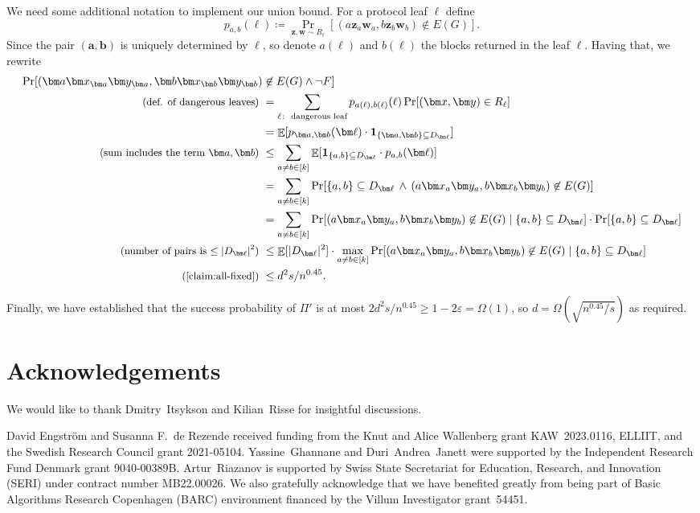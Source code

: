 \documentclass[10pt,a4paper]{article}
\theoremstyle{definition}
\theoremstyle{remark}
\theoremstyle{example}
\theoremstyle{plain}
\DeclareMathOperator{\Exp}{\mathbb{E}}
\renewcommand{\epsilon}{\varepsilon}
\newcommand{\protocolPiAlt}{\Pi'}
\begin{document}
We need some additional notation to implement our union bound. For a protocol leaf $\ell$ define 
\[p_{a,b}(\ell) \coloneqq \Pr_{\bm z, \bm w \sim R_\ell}[(a \bm z_{a} \bm w_{ a}, b \bm z_b \bm w_b) \not\in E(G)].\]
 Since the pair $(\bm a, \bm b)$ is uniquely determined by $\bm \ell$, so denote $a(\ell)$ and $b(\ell)$ the blocks returned in the leaf $\ell$. 
Having that, we rewrite
\begin{align*}
    \Pr[(\bm a \bm x_{\bm a} \bm y_{\bm a}, \bm b \bm x_{\bm b} \bm y_{\bm b})& \not\in E(G) \land \lnot F] \\
   \text{\small (def. of dangerous leaves) } &=
    \sum_{\ell\colon \text{ dangerous leaf}} p_{a(\ell),b(\ell)}(\ell) \Pr[(\bm x, \bm y) \in R_\ell]\\
    &=
    \Exp[p_{\bm a, \bm b}(\bm \ell) \cdot \mathbf{1}_{\{\bm a, \bm b\} \subseteq D_{\bm \ell}}]\\
   \text{\small (sum includes the term $\bm a, \bm b$) } &\le \sum_{a \neq b \in [k]} \Exp[\mathbf{1}_{\{a,b\} \subseteq D_{\bm \ell}} \cdot p_{a,b}(\bm \ell)]\\
    &= \sum_{a \neq b \in [k]} \Pr[\{a,b\} \subseteq D_{\bm \ell} \,\land\,(a \bm x_a \bm y_a, b \bm x_b \bm y_b) \not\in E(G)]\\
    &= \sum_{a \neq b \in [k]} \Pr[(a \bm x_a \bm y_a, b \bm x_b \bm y_b) \not\in E(G) \mid \{a,b\} \subseteq D_{\bm \ell}] \cdot \Pr[\{a,b\} \subseteq D_{\bm \ell}]\\
   \text{\small (number of pairs is $\le |D_{\bm\ell}|^2$) } &\le \Exp[|D_{\bm \ell}|^2] \cdot \max_{a \neq b \in [k]}  \Pr[(a \bm x_a \bm y_a, b \bm x_b \bm y_b) \not\in E(G) \mid \{a,b\} \subseteq D_{\bm \ell}] \\ 
   \text{\small (\autoref{claim:all-fixed}) }&\le d^2 s / n^{0.45}.
\end{align*}


Finally, we have established that the success probability of $\protocolPiAlt$ is at most $2 d^2 s/ n^{0.45} \ge 1 - 2\epsilon = \Omega(1)$, so $d = \Omega(\sqrt{n^{0.45} / s})$ as required.
\section*{Acknowledgements}
\label{sec:acknowledgements}
We would like to thank 
Dmitry~Itsykson and 
Kilian~Risse for insightful  
discussions.

David Engström and Susanna F.\ de Rezende received funding from the Knut and Alice Wallenberg grant \mbox{KAW 2023.0116}, ELLIIT, and the Swedish Research Council grant 
\mbox{2021-05104}.
Yassine~Ghannane and Duri~Andrea~Janett were supported by
the Independent Research Fund Denmark grant \mbox{9040-00389B}.
Artur~Riazanov is supported by Swiss
State Secretariat for Education, Research, and Innovation (SERI) under contract number MB22.00026.
We also gratefully acknowledge that we have benefited greatly from being part of Basic Algorithms Research Copenhagen (BARC) environment financed by the Villum Investigator grant~54451.



\end{document}
